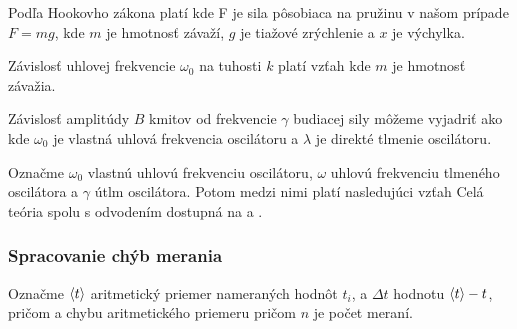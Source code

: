 \documentclass[a4paper,10pt]{article}
\begin{document}
Podľa Hookovho zákona platí
kde F je sila pôsobiaca na pružinu v našom prípade $F=mg$, 
kde $m$ je hmotnosť závaží, $g$ je tiažové zrýchlenie a $x$ je výchylka.

Závislosť uhlovej frekvencie $\omega_0$ na tuhosti $k$ platí vzťah
kde $m$ je hmotnosť závažia.

Závislosť amplitúdy $B$ kmitov od frekvencie $\gamma$ budiacej sily môžeme vyjadriť ako
kde $\omega_0$ je vlastná uhlová frekvencia oscilátoru a $\lambda$ je direkté tlmenie oscilátoru.

Označme $\omega_0$ vlastnú uhlovú frekvenciu oscilátoru, $\omega$ uhlovú frekvenciu tlmeného oscilátora a $\gamma$ útlm oscilátora. Potom medzi nimi platí nasledujúci vzťah
Celá teória spolu s odvodením dostupná na \cite{C_1} a \cite{C_2}.


\subsubsection{Spracovanie chýb merania}

Označme $\left< t \right>$ aritmetický priemer nameraných hodnôt $t_i$, a $\Delta t$ hodnotu $\left< t \right>-t$, pričom 
a chybu aritmetického priemeru 
pričom $n$ je počet meraní.
\end{document}
